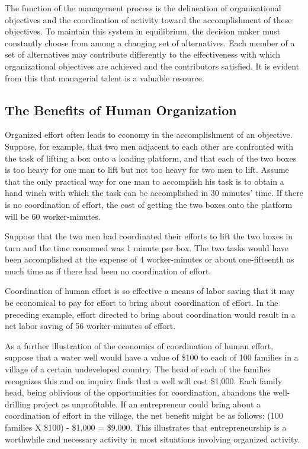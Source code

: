 The function of the management process is the delineation of organizational objectives and the coordination of activity toward the accomplishment of these objectives. To maintain this system in equilibrium, the decision maker must constantly choose from among a changing set of alternatives. Each member of a set of alternatives may contribute differently to the effectiveness with which organizational objectives are achieved and the contributors satisfied. It is evident from this that managerial talent is a valuable resource.

\subsection{The Benefits of Human Organization}

Organized effort often leads to economy in the accomplishment of an objective. Suppose, for example, that two men adjacent to each other are confronted with the task of lifting a box onto a loading platform, and that each of the two boxes is too heavy for one man to lift but not too heavy for two men to lift. Assume that the only practical way for one man to accomplish his task is to obtain a hand winch with which the task can be accomplished in 30 minutes’ time. If there is no coordination of effort, the cost of getting the two boxes onto the platform will be 60 worker-minutes.

Suppose that the two men had coordinated their efforts to lift the two boxes in turn and the time consumed was 1 minute per box. The two tasks would have been accomplished at the expense of 4 worker-minutes or about one-fifteenth as much time as if there had been no coordination of effort.

Coordination of human effort is so effective a means of labor saving that it may be economical to pay for effort to bring about coordination of effort. In the preceding example, effort directed to bring about coordination would result in a net labor saving of 56 worker-minutes of effort.

As a further illustration of the economics of coordination of human effort, suppose that a water well would have a value of \$100 to each of 100 families in a village of a certain undeveloped country. The head of each of the families recognizes this and on inquiry finds that a well will cost \$1,000. Each family head, being oblivious of the opportunities for coordination, abandons the well-drilling project as unprofitable. If an entrepreneur could bring about a coordination of effort in the village, the net benefit might be as follows: (100 families X \$100) - \$1,000 = \$9,000. This illustrates that entrepreneurship is a worthwhile and necessary activity in most situations involving organized activity.

